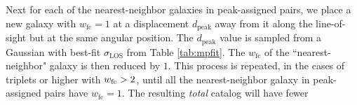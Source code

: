                                                                                                                                                                                                                                                                          Next for each of the nearest-neighbor galaxies in peak-assigned pairs, we 
                                                                                                                                                                                                                                                                         place a new galaxy with $w_\mathrm{fc} = 1$ at a displacement $d_\mathrm{peak}$ 
                                                                                                                                                                                                                                                                         away from it along the line-of-sight but at the same angular position. The $d_\mathrm{peak}$ 
                                                                                                                                                                                                                                                                         value is sampled from a Gaussian with best-fit $\sigma_\mathrm{LOS}$ from 
                                                                                                                                                                                                                                                                         Table \ref{tab:mpfit}. The $w_\mathrm{fc}$ of the ``nearest-neighbor" galaxy 
                                                                                                                                                                                                                                                                         is then reduced by $1$. This process is repeated, in the cases of triplets 
                                                                                                                                                                                                                                                                         or higher with $w_{\rm fc} > 2$, until all the nearest-neighbor galaxy in 
                                                                                                                                                                                                                                                                         peak-assigned pairs have $w_\mathrm{fc}=1$. The resulting {\em total} catalog will have fewer 
